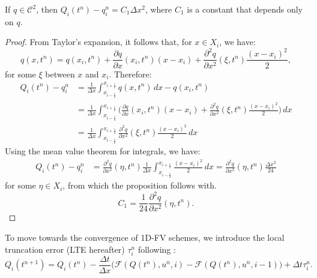 \begin{prop}
	\label{prop-bound-centroid}
	If $q \in \mathcal{C}^2$, then $Q_i(t^n)-q_i^n = C_1 \Delta x^2$, where $C_1$ is a constant that depends only on $q$. 
\end{prop}
\begin{proof}
	From Taylor's expansion, it follows that, for $x \in X_i$, we have:
	\begin{equation}
		q(x,t^n) = q(x_i,t^n) +  
		\frac{\partial q}{\partial x} (x_i, t^n)(x-x_i) + 
		\frac{\partial^2 q}{\partial x^2} (\xi, t^n)\frac{(x-x_i)^2}{2},
	\end{equation}
	for some $\xi$ between $x$ and $x_i$. Therefore:
	\begin{align*}
		Q_{i}(t^n)-q_i^n &=  \frac{1}{\Delta x} \int_{x_{i-\frac{1}{2}}}^{x_{i+\frac{1}{2}}} q(x,t^n)\,dx -q(x_i,t^n)  \\ 
		&= \frac{1}{\Delta x} \int_{x_{i-\frac{1}{2}}}^{x_{i+\frac{1}{2}}} 
		\bigg( \frac{\partial q}{\partial x} (x_i, t^n)(x-x_i) + 
		\frac{\partial^2 q}{\partial x^2} (\xi, t^n)\frac{(x-x_i)^2}{2} \bigg) \,dx \\ 
		&=  \frac{1}{\Delta x} \int_{x_{i-\frac{1}{2}}}^{x_{i+\frac{1}{2}}} 
		\frac{\partial^2 q}{\partial x^2} (\xi, t^n)\frac{(x-x_i)^2}{2}  \,dx
	\end{align*}
    Using the mean value theorem for integrals, we have:
	\begin{align*}
	Q_{i}(t^n)-q_i^n &=  
	\frac{\partial^2 q}{\partial x^2} (\eta, t^n)
 \frac{1}{\Delta x} \int_{x_{i-\frac{1}{2}}}^{x_{i+\frac{1}{2}}} 
\frac{(x-x_i)^2}{2}  \,dx = \frac{\partial^2 q}{\partial x^2} (\eta, t^n)\frac{\Delta x^2}{24}
\end{align*}	
for some $\eta \in X_i$, from which the proposition follows with.
\begin{equation}
	C_1 = \frac{1}{24}\frac{\partial^2 q}{\partial x^2} (\eta, t^n).
\end{equation}
\end{proof}

To move towards the convergence of 1D-FV schemes, we introduce the local truncation error (LTE hereafter)
$\tau_i^n$ following \citet{leveque:2002}:
\begin{equation}
	\label{consistency-1d-eq1}
	Q_i(t^{n+1}) = Q_i(t^n) - \frac{\Delta t}{\Delta x}
	\bigg(\mathcal{F}(Q(t^n),u^n,i)-\mathcal{F}(Q(t^n),u^n,i-1) \bigg) + \Delta t \tau_i^n.
\end{equation}


